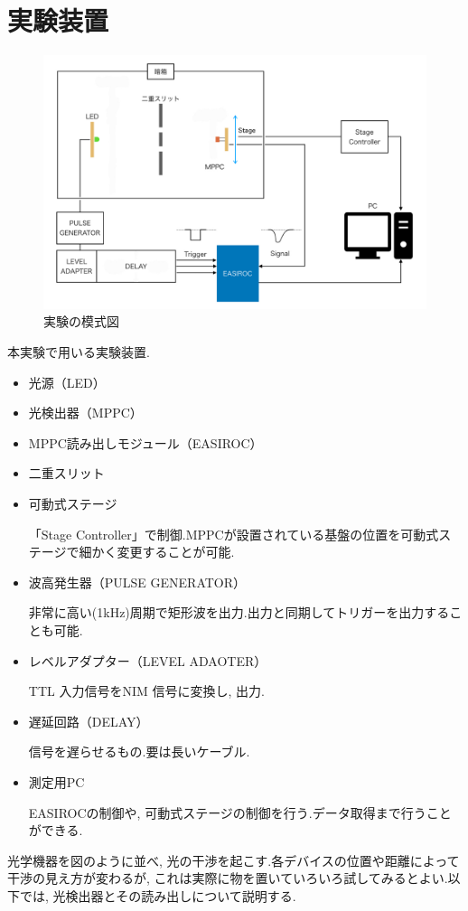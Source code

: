 
\section{実験装置}
\begin{figure}[h]
  \begin{center}
    \includegraphics[width=12cm]{../setup_2021.jpeg}
  \end{center}
  \caption{実験の模式図}
\end{figure}

本実験で用いる実験装置.
\begin{itemize}
  \item 光源（LED）
  \item 光検出器（MPPC）
  \item MPPC読み出しモジュール（EASIROC）
  \item 二重スリット
  \item 可動式ステージ\par
        「Stage Controller」で制御.MPPCが設置されている基盤の位置を可動式ステージで細かく変更することが可能.
  \item 波高発生器（PULSE GENERATOR）\par
        非常に高い(1kHz)周期で矩形波を出力.出力と同期してトリガーを出力することも可能.
  \item レベルアダプター（LEVEL ADAOTER）\par
        TTL 入力信号をNIM 信号に変換し, 出力.
  \item 遅延回路（DELAY）\par
        信号を遅らせるもの.要は長いケーブル.
  \item 測定用PC \par
        EASIROCの制御や, 可動式ステージの制御を行う.データ取得まで行うことができる.
\end{itemize}
光学機器を図のように並べ, 光の干渉を起こす.各デバイスの位置や距離によって干渉の見え方が変わるが, これは実際に物を置いていろいろ試してみるとよい.以下では, 光検出器とその読み出しについて説明する.

